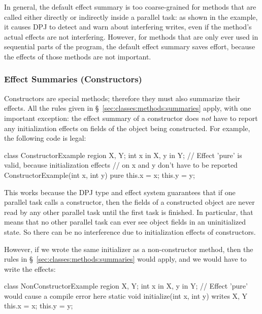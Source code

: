 In general, the default effect summary is too coarse-grained for
methods that are called either directly or indirectly inside a
parallel task: as shown in the example, it causes DPJ to detect and
warn about interfering writes, even if the method's actual effects are
not interfering.  However, for methods that are only ever used in
sequential parts of the program, the default effect summary saves
effort, because the effects of those methods are not important.

\subsubsection{Effect Summaries (Constructors)%
\label{sec:classes:methods:summaries-constructor}}

Constructors are special methods; therefore they must also summarize
their effects.  All the rules given in
\S~\ref{sec:classes:methods:summaries} apply, with one important
exception: the effect summary of a constructor does \emph{not} have to
report any initialization effects on fields of the object being
constructed.  For example, the following code is legal:
%
\begin{dpjlisting}
class ConstructorExample {
    region X, Y;
    int x in X, y in Y;
    // Effect 'pure' is valid, because initialization effects
    // on x and y don't have to be reported
    ConstructorExample(int x, int y) pure {
        this.x = x;
        this.y = y;
    }
}
\end{dpjlisting}
%
This works because the DPJ type and effect system guarantees that if
one parallel task calls a constructor, then the fields of a
constructed object are never read by any other parallel task until the
first task is finished.  In particular, that means that no other
parallel task can ever see object fields in an uninitialized state.
So there can be no interference due to initialization effects of
constructors.

However, if we wrote the same initializer as a non-constructor method,
then the rules in \S~\ref{sec:classes:methods:summaries} would apply,
and we would have to write the effects:
%
\begin{dpjlisting}
class NonConstructorExample {
    region X, Y;
    int x in X, y in Y;
    // Effect 'pure' would cause a compile error here
    static void initialize(int x, int y) writes X, Y {
        this.x = x;
        this.y = y;
    }
}
\end{dpjlisting}

